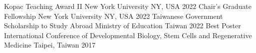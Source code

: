 



\begin{cvhonors}

  \cvhonor
    {Kopac Teaching Award II} %
    {New York University} %
    {NY, USA} %
    {2022} %
  \cvhonor
    {Chair's Graduate Fellowship} %
    {New York University} %
    {NY, USA} %
    {2022} %
  \cvhonor
    {Taiwanese Government Scholarship to Study Abroad} %
    {Ministry of Education} %
    {Taiwan} %
    {2022} %
  \cvhonor
    {Best Poster} %
    {International Conference of Developmental Biology, Stem Cells and Regenerative Medicine} %
    {Taipei, Taiwan} %
    {2017} %
\end{cvhonors}

